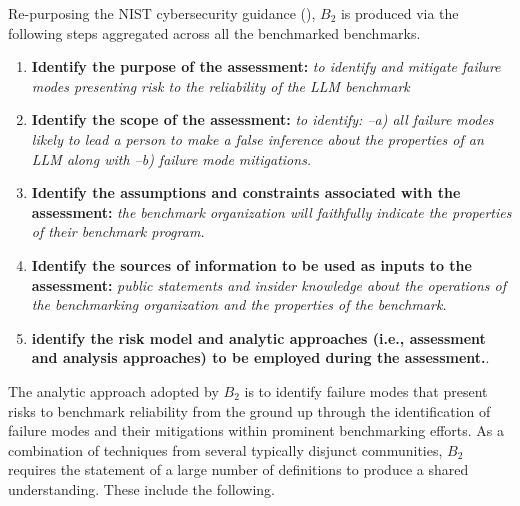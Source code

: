 \documentclass{article}
\newcommand\bb{$B_2$ }
\begin{document}
Re-purposing the NIST cybersecurity guidance (\cite{nist80030r1}), \bb is produced via the following steps aggregated across all the benchmarked benchmarks.

\begin{enumerate}
    \item {\bf Identify the purpose of the assessment:} \textit{to identify and mitigate failure modes presenting risk to the reliability of the LLM benchmark}
    \item {\bf Identify the scope of the assessment:} \textit{to identify: --a) all failure modes likely to lead a person to make a false inference about the properties of an LLM along with --b) failure mode mitigations.}
    \item {\bf Identify the assumptions and constraints associated with the assessment:} \textit{the benchmark organization will faithfully indicate the properties of their benchmark program.}
    \item {\bf Identify the sources of information to be used as inputs to the assessment:} \textit{public statements and insider knowledge about the operations of the benchmarking organization and the properties of the benchmark.}
    \item  {\bf identify the risk model and analytic approaches (i.e., assessment and analysis approaches) to be employed during the assessment.}.
\end{enumerate}

The analytic approach adopted by \bb is to identify failure modes that present risks to benchmark reliability from the ground up through the identification of failure modes and their mitigations within prominent benchmarking efforts. As a combination of techniques from several typically disjunct communities, \bb requires the statement of a large number of definitions to produce a shared understanding. These include the following.
\end{document}
